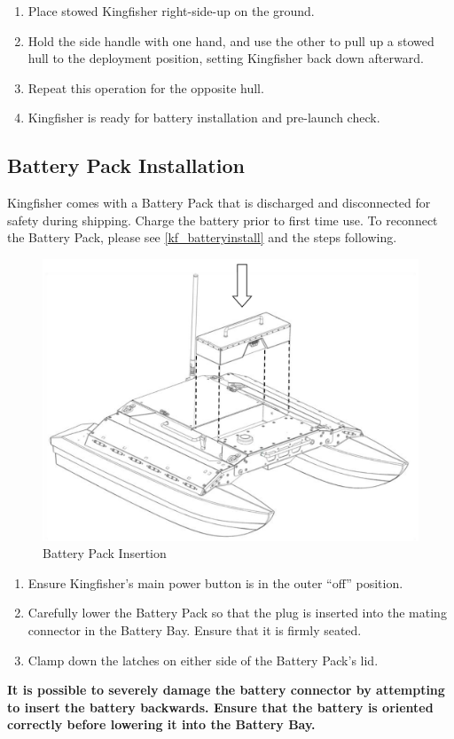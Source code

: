 \documentclass[]{clearpath-latex/clearpath-manual}
\begin{document}
\begin{enumerate}[nolistsep]
	\item Place stowed Kingfisher right-side-up on the ground.
	\item Hold the side handle with one hand, and use the other to pull up a stowed hull to the deployment position, setting Kingfisher back down afterward.
	\item Repeat this operation for the opposite hull.
	\item Kingfisher is ready for battery installation and pre-launch check.
\end{enumerate}
\newpage

\subsection{Battery Pack Installation}
Kingfisher comes with a Battery Pack that is discharged and disconnected for safety during shipping. Charge the battery prior to first time use.
To reconnect the Battery Pack, please see \autoref{kf_batteryinstall} and the steps following.

\begin{figure}[h]
  \centering
  \includegraphics[width=0.75\linewidth]{kf_batteryinstall.PNG}
  \caption{Battery Pack Insertion}
  \label{kf_batteryinstall}
\end{figure}

\begin{enumerate}[nolistsep]
	\item Ensure Kingfisher’s main power button is in the outer “off” position.
	\item Carefully lower the Battery Pack so that the plug is inserted into the mating connector in the Battery Bay. Ensure that it is firmly seated.
	\item Clamp down the latches on either side of the Battery Pack's lid.
\end{enumerate}
\textbf{It is possible to severely damage the battery connector by attempting to insert the battery backwards. Ensure that the battery is oriented correctly before lowering it into the Battery Bay.}
\newpage
\end{document}
